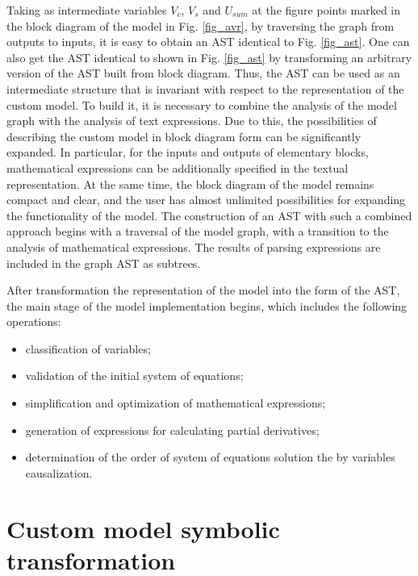 \documentclass[lettersize,journal]{IEEEtran}
\begin{document}
Taking as intermediate variables \(V_{c}\), \(V_{s}\) and \(U_{sum} \) at the figure points marked in the block diagram
of the model in Fig. \ref{fig_avr}, by traversing the graph from outputs to inputs, it is easy to obtain an AST 
identical to Fig. \ref{fig_ast}. One can also get the AST identical to shown in Fig. \ref{fig_ast} by transforming 
an arbitrary version of the AST built from block diagram. Thus, the AST can be used as an intermediate structure 
that is invariant with respect to the representation of the custom model. To build it, it is necessary to combine 
the analysis of the model graph with the analysis of text expressions. Due to this, the possibilities of describing 
the custom model in block diagram form can be significantly expanded. In particular, for the inputs and outputs 
of elementary blocks, mathematical expressions can be additionally specified in the textual representation. 
At the same time, the block diagram of the model remains compact and clear, and the user has almost unlimited 
possibilities for expanding the functionality of the model. The construction of an AST with such a combined approach 
begins with a traversal of the model graph, with a transition to the analysis of mathematical expressions. The results 
of parsing expressions are included in the graph AST as subtrees.

After transformation the representation of the model into the form of the AST, the main stage of the model implementation begins, which includes the following operations:
\begin{itemize}
	\item classification of variables;
	\item validation of the initial system of equations;
	\item simplification and optimization of mathematical expressions;
	\item generation of expressions for calculating partial derivatives;
	\item determination of the order of system of equations solution the by variables causalization.
\end{itemize}

\section{Custom model symbolic transformation}
\end{document}
